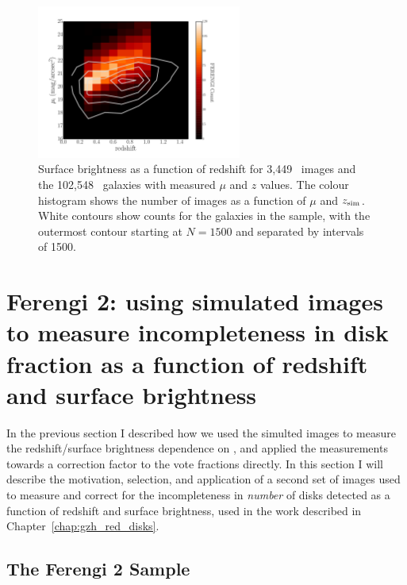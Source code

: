 \begin{figure}
\begin{center}
\includegraphics[width=0.6\textwidth]{figures/eye_of_sauron.pdf}
\caption{Surface brightness as a function of redshift for 3,449~\ferengi{}
images and the 102,548~\main{} galaxies with measured $\mu$ and $z$ values. The
colour histogram shows the number of \ferengi{} images as a function of $\mu$
and $z_{\rm sim}$. White contours show counts for the galaxies in the \main{}
sample, with the outermost contour starting at $N=1500$ and separated by
intervals of 1500.} 
\label{fig:eye_of_sauron}
\end{center}
\end{figure}

\section{Ferengi 2: using simulated images to measure incompleteness in disk fraction as a function of redshift and surface brightness}

In the previous section I described how we used the simulted \ferengi{} images to measure the redshift/surface brightness dependence on \ffeatures, and applied the measurements towards a correction factor to the vote fractions directly. In this section I will describe the motivation, selection, and application of a second set of \ferengi{} images used to measure and correct for the incompleteness in \emph{number} of disks detected as a function of redshift and surface brightness, used in the work described in Chapter~\ref{chap:gzh_red_disks}.

\subsection{The Ferengi 2 Sample}
\label{ssec:ferengi2sample}

